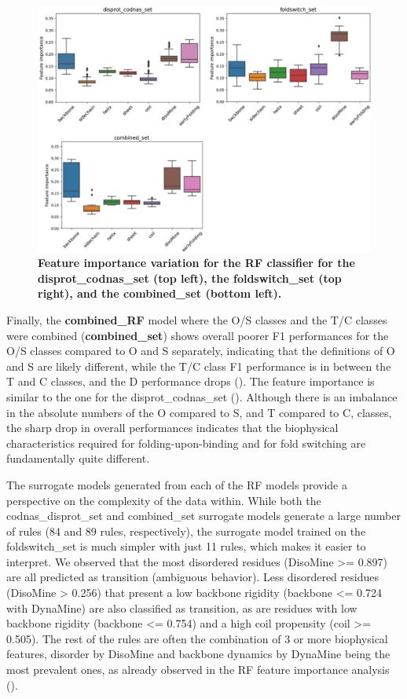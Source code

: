 \begin{figure}[tbh]
    \centering
    \includegraphics[width=\linewidth]{ambiguous//figures_ambiguous/fig2.pdf}
    \caption{\textbf{Feature importance variation for the RF classifier for the disprot_codnas_set (top left), the foldswitch_set (top right), and the combined_set (bottom left).}}
    \label{fig:chapter5:fig2}
\end{figure}

Finally, the \textbf{combined_RF} model where the O/S classes and the T/C classes were combined (\textbf{combined_set}) shows overall poorer F1 performances for the O/S classes compared to O and S separately, indicating that the definitions of O and S are likely different, while the T/C class F1 performance is in between the T and C classes, and the D performance drops (). The feature importance is similar to the one for the disprot_codnas_set (). Although there is an imbalance in the absolute numbers of the O compared to S, and T compared to C, classes, the sharp drop in overall performances indicates that the biophysical characteristics required for folding-upon-binding and for fold switching are fundamentally quite different.

The surrogate models generated from each of the RF models provide a perspective on the complexity of the data within. While both the codnas_disprot_set and combined_set surrogate models generate a large number of rules (84 and 89 rules, respectively), the surrogate model trained on the foldswitch_set is much simpler with just 11 rules, which makes it easier to interpret. We observed that the most disordered residues (DisoMine >= 0.897) are all predicted as transition (ambiguous behavior). Less disordered residues (DisoMine > 0.256) that present a low backbone rigidity (backbone <= 0.724 with DynaMine) are also classified as transition, as are residues with low backbone rigidity (backbone <= 0.754) and a high coil propensity (coil >= 0.505). The rest of the rules are often the combination of 3 or more biophysical features, disorder by DisoMine and backbone dynamics by DynaMine being the most prevalent ones, as already observed in the RF feature importance analysis ().


